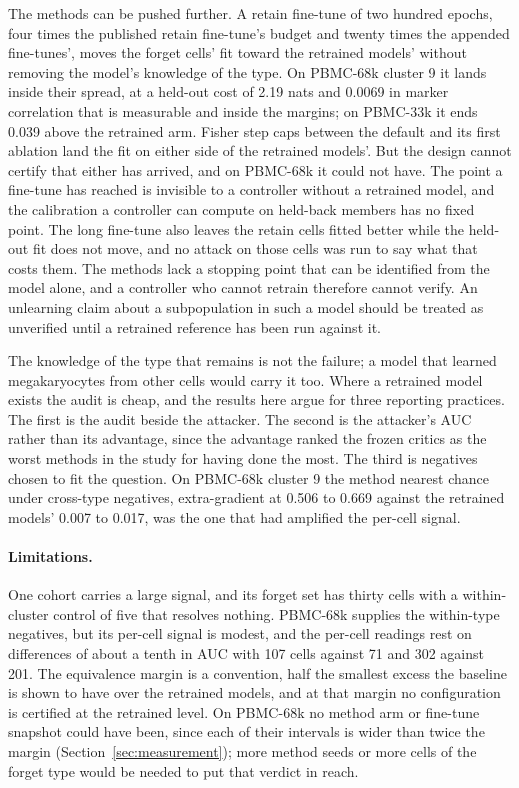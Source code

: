 \documentclass{article}
\begin{document}
The methods can be pushed further. A retain fine-tune of two hundred epochs, four times the published retain fine-tune's budget and twenty times the appended fine-tunes', moves the forget cells' fit toward the retrained models' without removing the model's knowledge of the type. On PBMC-68k cluster 9 it lands inside their spread, at a held-out cost of 2.19 nats and 0.0069 in marker correlation that is measurable and inside the margins; on PBMC-33k it ends 0.039 above the retrained arm. Fisher step caps between the default and its first ablation land the fit on either side of the retrained models'. But the design cannot certify that either has arrived, and on PBMC-68k it could not have. The point a fine-tune has reached is invisible to a controller without a retrained model, and the calibration a controller can compute on held-back members has no fixed point. The long fine-tune also leaves the retain cells fitted better while the held-out fit does not move, and no attack on those cells was run to say what that costs them. The methods lack a stopping point that can be identified from the model alone, and a controller who cannot retrain therefore cannot verify. An unlearning claim about a subpopulation in such a model should be treated as unverified until a retrained reference has been run against it.

The knowledge of the type that remains is not the failure; a model that learned megakaryocytes from other cells would carry it too. Where a retrained model exists the audit is cheap, and the results here argue for three reporting practices. The first is the audit beside the attacker. The second is the attacker's AUC rather than its advantage, since the advantage ranked the frozen critics as the worst methods in the study for having done the most. The third is negatives chosen to fit the question. On PBMC-68k cluster 9 the method nearest chance under cross-type negatives, extra-gradient at 0.506 to 0.669 against the retrained models' 0.007 to 0.017, was the one that had amplified the per-cell signal.

\paragraph{Limitations.} One cohort carries a large signal, and its forget set has thirty cells with a within-cluster control of five that resolves nothing. PBMC-68k supplies the within-type negatives, but its per-cell signal is modest, and the per-cell readings rest on differences of about a tenth in AUC with 107 cells against 71 and 302 against 201. The equivalence margin is a convention, half the smallest excess the baseline is shown to have over the retrained models, and at that margin no configuration is certified at the retrained level. On PBMC-68k no method arm or fine-tune snapshot could have been, since each of their intervals is wider than twice the margin (Section~\ref{sec:measurement}); more method seeds or more cells of the forget type would be needed to put that verdict in reach.
\end{document}
